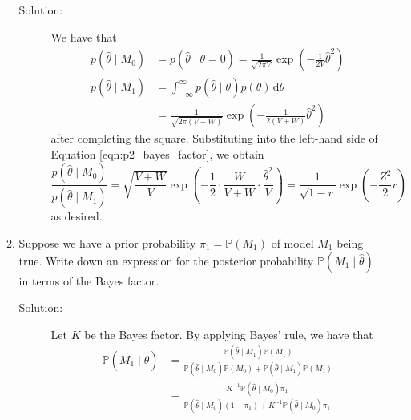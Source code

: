 \documentclass[letterpaper,11pt]{article}
\begin{document}
\begin{enumerate}
\begin{enumerate}
    \begin{description}
    \item[Solution:] We have that
      \begin{align*}
        p\left(\hat{\theta} \mid M_0\right)
        &= p\left(\hat{\theta} \mid \theta = 0\right)
          = \frac{1}{\sqrt{2\pi V}}\exp\left(-\frac{1}{2V}\hat{\theta}^2\right) \\
        p\left(\hat{\theta} \mid M_1\right)
        &= \int_{-\infty}^\infty p\left(\hat{\theta} \mid \theta\right)p\left(\theta\right)\,\mathrm{d}\theta \\
        &= \frac{1}{\sqrt{2\pi\left(V + W\right)}}\exp\left(
          -\frac{1}{2\left(V + W\right)}\hat\theta^2
          \right)
      \end{align*}
      after completing the square. Substituting into the left-hand side of
      Equation \ref{eqn:p2_bayes_factor}, we obtain
      \begin{equation*}
        \frac{p\left(\hat\theta \mid M_0\right)}{p\left(\hat\theta \mid M_1\right)}
        = \sqrt{\frac{V+W}{V}}\exp\left(-\frac{1}{2}\cdot \frac{W}{V+W} \cdot \frac{\hat\theta^2}{V}\right)
        = \frac{1}{\sqrt{1-r}}\exp\left(-\frac{Z^2}{2}r\right)
      \end{equation*}
      as desired. 
    \end{description}
  \item \label{part:p2c} Suppose we have a prior probability $\pi_1 = \mathbb{P}\left(M_1\right)$
    of model $M_1$ being true. Write down an expression for the posterior
    probability $\mathbb{P}\left(M_1 \mid \hat{\theta}\right)$ in terms of the
    Bayes factor.
    \begin{description}
    \item[Solution:] Let $K$ be the Bayes factor. By applying Bayes' rule, we
      have that
      \begin{align*}
        \mathbb{P}\left(
          M_1 \mid \hat\theta
        \right)
        &=
        \frac
        {\mathbb{P}\left(\hat\theta \mid M_1\right)\mathbb{P}\left(M_1\right)}
        {\mathbb{P}\left(\hat\theta \mid M_0\right)\mathbb{P}\left(M_0\right) +
          \mathbb{P}\left(\hat\theta \mid M_1\right)\mathbb{P}\left(M_1\right)} \\
        &= \frac
          {K^{-1}\mathbb{P}\left(\hat\theta \mid M_0\right)\pi_1}
        {\mathbb{P}\left(\hat\theta \mid M_0\right)\left(1 - \pi_1\right) +
          K^{-1}\mathbb{P}\left(\hat\theta \mid M_0\right)\pi_1} \\

\end{align*}
\end{description}
\end{enumerate}
\end{enumerate}
\end{document}
